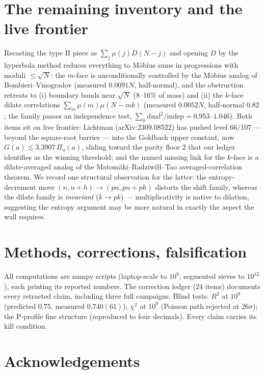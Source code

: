 \documentclass[11pt]{article}
\theoremstyle{definition}
\begin{document}
\section{The remaining inventory and the live frontier}

Recasting the type II piece as $\sum_j \mu(j) D(N-j)$ and opening $D$ by
the hyperbola method reduces everything to M\"obius sums in progressions
with moduli $\le \sqrt N$: the $m$-face is unconditionally controlled by
the M\"obius analog of Bombieri--Vinogradov (measured $0.0091N$,
half-normal), and the obstruction retreats to (i) boundary bands near
$\sqrt N$ (8--16\% of mass) and (ii) the $k$-face dilate correlations
$\sum_m \mu(m)\mu(N-mk)$ (measured $0.0052N$, half-normal $0.82$; the
family passes an independence test, $\sum_k \mathrm{dual}^2 /
\mathrm{indep} = 0.953$--$1.046$). Both items sit on live frontier:
Lichtman (arXiv:2309.08522) has pushed level $66/107$ --- beyond the
square-root barrier --- into the Goldbach upper constant, now
$G(a) \lesssim 3.3907\,\Pi_a(a)$, sliding toward the parity floor $2$
that our ledger identifies as the winning threshold; and the named
missing link for the $k$-face is a dilate-averaged analog of the
Matom\"aki--Radziwi\l{}\l{}--Tao averaged-correlation theorem. We record
one structural observation for the latter: the entropy-decrement move
$(n, n+h) \to (pn, pn+ph)$ distorts the shift family, whereas the dilate
family is \emph{invariant} ($k \to pk$) --- multiplicativity is native
to dilation, suggesting the entropy argument may be more natural in
exactly the aspect the wall requires.

\section{Methods, corrections, falsification}

All computations are numpy scripts (laptop-scale to $10^9$; segmented
sieves to $10^{12}$), each printing its reported numbers. The
correction ledger (24 items) documents every retracted claim, including
three full campaigns. Blind tests: $R^2$ at $10^9$ (predicted $0.75$,
measured $0.740(61)$); $\chi^2$ at $10^9$ (Poisson path rejected at
$26\sigma$); the P-profile fine structure (reproduced to four
decimals). Every claim carries its kill condition.

\section*{Acknowledgements}
\end{document}
